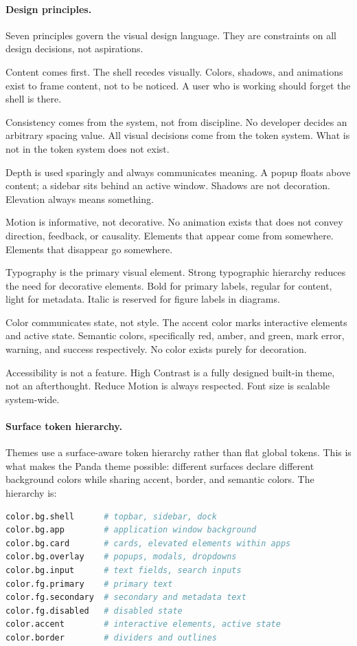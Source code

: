 \paragraph{Design principles.}
Seven principles govern the visual design language. They are constraints on
all design decisions, not aspirations.

Content comes first. The shell recedes visually. Colors, shadows, and
animations exist to frame content, not to be noticed. A user who is working
should forget the shell is there.

Consistency comes from the system, not from discipline. No developer decides
an arbitrary spacing value. All visual decisions come from the token system.
What is not in the token system does not exist.

Depth is used sparingly and always communicates meaning. A popup floats above
content; a sidebar sits behind an active window. Shadows are not decoration.
Elevation always means something.

Motion is informative, not decorative. No animation exists that does not
convey direction, feedback, or causality. Elements that appear come from
somewhere. Elements that disappear go somewhere.

Typography is the primary visual element. Strong typographic hierarchy reduces
the need for decorative elements. Bold for primary labels, regular for content,
light for metadata. Italic is reserved for figure labels in diagrams.

Color communicates state, not style. The accent color marks interactive
elements and active state. Semantic colors, specifically red, amber, and green, mark error,
warning, and success respectively. No color exists purely for decoration.

Accessibility is not a feature. High Contrast is a fully designed built-in
theme, not an afterthought. Reduce Motion is always respected. Font size is
scalable system-wide.

\paragraph{Surface token hierarchy.}
Themes use a surface-aware token hierarchy rather than flat global tokens.
This is what makes the Panda theme possible: different surfaces declare
different background colors while sharing accent, border, and semantic colors.
The hierarchy is:

\begin{lstlisting}[language=bash, caption={Surface token hierarchy}]
color.bg.shell      # topbar, sidebar, dock
color.bg.app        # application window background
color.bg.card       # cards, elevated elements within apps
color.bg.overlay    # popups, modals, dropdowns
color.bg.input      # text fields, search inputs
color.fg.primary    # primary text
color.fg.secondary  # secondary and metadata text
color.fg.disabled   # disabled state
color.accent        # interactive elements, active state
color.border        # dividers and outlines
\end{lstlisting}

